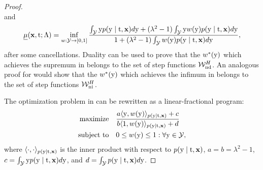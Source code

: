 \begin{lemma}
\begin{proof}
\begin{equation}
        \end{equation}
        and
        \begin{equation}
            \label{eq:lower_capo_app}
            \underline{\mu}(\mathbf{x}, \mathrm{t}; \Lambda) 
            = \inf_{w: \mathcal{Y} \to [0, 1]} \frac{\int_{\mathcal{Y}} \mathrm{y} p(\mathrm{y} \mid \mathrm{t}, \mathbf{x})d\mathrm{y} + (\lambda^2 - 1)\int_{\mathcal{Y}} \mathrm{y} w(\mathrm{y})p(\mathrm{y} \mid \mathrm{t}, \mathbf{x})d\mathrm{y}}{1 + (\lambda^2 - 1)\int_{\mathcal{Y}} w(\mathrm{y})p(\mathrm{y} \mid \mathrm{t}, \mathbf{x})d\mathrm{y}},
        \end{equation}
        after some cancellations.
        Duality can be used to prove that the $w^*(\mathrm{y})$ which achieves the supremum in  belongs to the set of step functions $\mathcal{W}_{\textrm{nd}}^{H}$. 
        An analogous proof for  would show that the $w^*(\mathrm{y})$ which achieves the infimum in  belongs to the set of step functions $\mathcal{W}_{\textrm{ni}}^{H}$.
        
        The optimization problem in  can be rewritten as a linear-fractional program:
        \begin{subequations}
            \label{eq:lfp}
            \begin{align}
                \text{maximize}\quad & \frac{a\langle \mathrm{y}, w(\mathrm{y}) \rangle_{p(\mathrm{y} \mid \mathrm{t}, \mathbf{x})} + c}{b\langle 1, w(\mathrm{y}) \rangle_{p(\mathrm{y} \mid \mathrm{t}, \mathbf{x})} + d} \\
                \text{subject to}\quad & 0 \leq w(\mathrm{y}) \leq 1: \forall\mathrm{y} \in \mathcal{Y},
            \end{align}
        \end{subequations}
        where $\langle \cdot, \cdot \rangle_{p(\mathrm{y} \mid \mathrm{t}, \mathbf{x})}$ is the inner product with respect to $p(\mathrm{y} \mid \mathrm{t}, \mathbf{x})$, $a = b = \lambda^2 - 1$, $c = \int_{\mathcal{Y}} \mathrm{y} p(\mathrm{y} \mid \mathrm{t}, \mathbf{x}) d\mathrm{y}$, and $d = \int_{\mathcal{Y}} p(\mathrm{y} \mid \mathrm{t}, \mathbf{x}) d\mathrm{y}$.
        

\end{proof}
\end{lemma}
